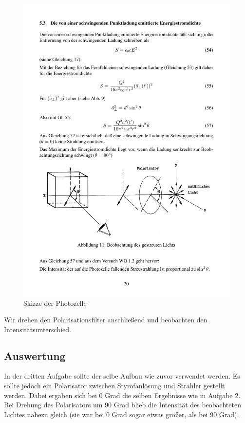 \documentclass[12pt]{scrartcl}
\begin{document}
\begin{figure}[H] 
  \centering
    \includegraphics[trim = 0mm 40mm 0mm 113mm, clip, scale = 1]{abb_11.pdf}
  	\caption[Skizze der Photozelle]{Skizze der Photozelle\footnotemark}
  \label{fig:abb_11}
\end{figure}

Wir drehen den Polarisationsfilter anschließend und beobachten den Intensitätsunterschied.
\subsection{Auswertung}
In der dritten Aufgabe sollte der selbe Aufbau wie zuvor verwendet werden. Es sollte jedoch ein Polarisator zwischen Styrofanlösung und Strahler gestellt werden. Dabei ergaben sich bei 0 Grad die selben Ergebnisse wie in Aufgabe 2. Bei Drehung des Polarisators um 90 Grad blieb die Intensität des beobachteten Lichtes nahezu gleich (sie war bei 0 Grad sogar etwas größer, als bei 90 Grad).
\end{document}

